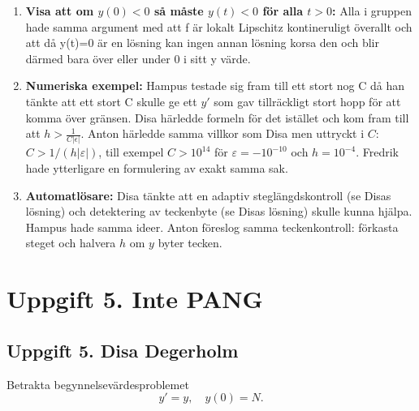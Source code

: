 \documentclass{article}
\begin{document}
\begin{enumerate}
    RK4 tar däremot delsteg längre fram i intervallet där lutningen $f(t, y) = y^2$ redan har hunnit växa kraftigt. På grund av den höga ordningen $\mathcal{O}(h^4)$ följer RK4 den explosiva tillväxten mycket mer precist och nådde tröskeln $y \ge 10^5$ strax \emph{före} den analytiska singulariteten $t^* \approx 1{,}1$ innan flyttalsöverflöde (\texttt{overflow}) inträffade. Att Disa kunde ta fler eller färre steg beror helt på vald steglängd $h$ och avbrottströskel. Den numeriska smälltiden beror alltså på metodens ordning och valda stoppvillkor, och man kan inte lita på numeriska lösare i omedelbar närhet av en vertikal asymptot.
    \item \textbf{Visa att om $y(0)<0$ så måste $y(t)<0$ för alla $t>0$:} Alla i gruppen hade samma argument med att f är lokalt Lipschitz kontineruligt överallt och att då y(t)=0 är en lösning kan ingen annan lösning korsa den och blir därmed bara över eller under 0 i sitt y värde.
    \item \textbf{Numeriska exempel:} Hampus testade sig fram till ett stort nog C då han tänkte att ett stort C skulle ge ett $y'$ som gav tillräckligt stort hopp för att komma över gränsen. Disa härledde formeln för det istället och kom fram till att $h > \frac{1}{C |\epsilon|}$. Anton härledde samma villkor som Disa men uttryckt i $C$: $C > 1/(h|\varepsilon|)$,
    till exempel $C > 10^{14}$ för $\varepsilon = -10^{-10}$ och $h = 10^{-4}$. Fredrik hade ytterligare en formulering av exakt samma sak.
    \item \textbf{Automatlösare:} Disa tänkte att en adaptiv steglängdskontroll (se Disas lösning) och detektering av teckenbyte (se Disas lösning) skulle kunna hjälpa. Hampus hade samma ideer. Anton föreslog samma teckenkontroll: förkasta steget och halvera $h$ om $y$
    byter tecken.
    \end{enumerate}

\section*{Uppgift 5. Inte PANG}

\subsection*{Uppgift 5. Disa Degerholm}

Betrakta begynnelsevärdesproblemet
\begin{equation}
    y' = y, \quad y(0) = N.
\end{equation}
\end{document}
